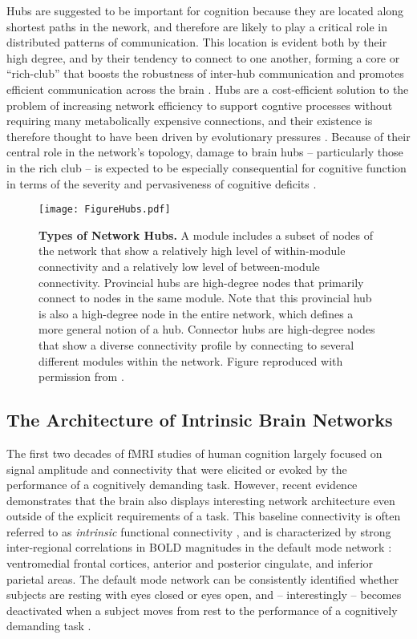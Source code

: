 \documentclass[12pt]{article}
\begin{document}
Hubs are suggested to be important for cognition because they are located along shortest paths in the nework, and therefore are likely to play a critical role in distributed patterns of communication. This location is evident both by their high degree, and by their tendency to connect to one another, forming a core or ``rich-club'' \cite{hagmann2008mapping,van2011rich,van2012high,van2013anatomical,van2011rich} that boosts the robustness of inter-hub communication and promotes efficient communication across the brain \cite{van2011rich}. Hubs are a cost-efficient solution to the problem of increasing network efficiency to support cogntive processes without requiring many metabolically expensive connections, and their existence is therefore thought to have been driven by evolutionary pressures \cite{van2013high}. Because of their central role in the network's topology, damage to brain hubs -- particularly those in the rich club \cite{van2011rich} -- is expected to be especially consequential for cognitive function in terms of the severity and pervasiveness of cognitive deficits \cite{warren2014network}.


 \begin{figure}[h!]
 	\centerline{\texttt{[image: FigureHubs.pdf]}}
 	\caption{\textbf{Types of Network Hubs.} A module includes a subset of nodes of the network that show a relatively high level of within-module connectivity and a relatively low level of between-module connectivity. Provincial hubs are high-degree nodes that primarily connect to nodes in the same module. Note that this provincial hub is also a high-degree node in the entire network, which defines a more general notion of a hub. Connector hubs are high-degree nodes that show a diverse connectivity profile by connecting to several different modules within the network. Figure reproduced with permission from \cite{vandenHeuvel2013}.}
 	\label{fig:hubs}
 	\centering
 \end{figure}
\newpage

\subsection*{The Architecture of Intrinsic Brain Networks}

The first two decades of fMRI studies of human cognition largely focused on signal amplitude and connectivity that were elicited or evoked by the performance of a cognitively demanding task. However, recent evidence demonstrates that the brain also displays interesting network architecture even outside of the explicit requirements of a task. This baseline connectivity is often referred to as \emph{intrinsic} functional connectivity \cite{Seeley2007}, and is characterized by strong inter-regional correlations in BOLD magnitudes in the default mode network \cite{raichle2001default}: ventromedial frontal cortices, anterior and posterior cingulate, and inferior parietal areas. The default mode network can be consistently identified whether subjects are resting with eyes closed or eyes open, and -- interestingly -- becomes deactivated when a subject moves from rest to the performance of a cognitively demanding task \cite{raichle2001default}. 
\end{document}
